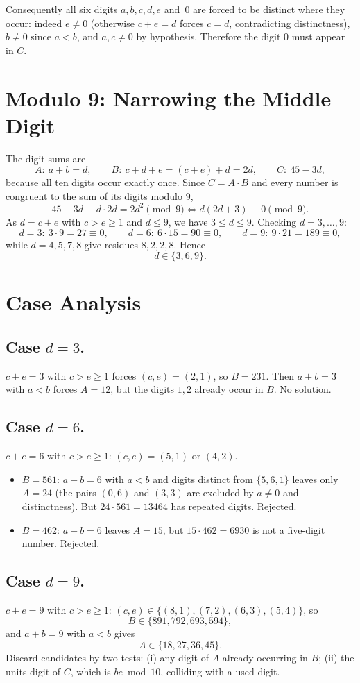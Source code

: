 \documentclass[10pt]{article}
\theoremstyle{definition}
\begin{document}
Consequently all six digits $a,b,c,d,e$ and~$0$ are forced to be distinct
where they occur: indeed $e\neq 0$ (otherwise $c+e=d$ forces $c=d$, contradicting
distinctness), $b\neq 0$ since $a<b$, and $a,c\neq 0$ by hypothesis. Therefore the
digit $0$ must appear in $C$.

\section*{Modulo 9: Narrowing the Middle Digit}
The digit sums are
\[
A:\ a+b=d,\qquad B:\ c+d+e=(c+e)+d=2d,\qquad C:\ 45-3d,
\]
because all ten digits occur exactly once. Since $C=A\cdot B$ and every number is
congruent to the sum of its digits modulo $9$,
\[
45-3d\equiv d\cdot 2d=2d^{2}\pmod 9
\iff d(2d+3)\equiv 0\pmod 9.
\]
As $d=c+e$ with $c>e\ge 1$ and $d\le 9$, we have $3\le d\le 9$. Checking
$d=3,\dots,9$:
\[
d=3:\ 3\cdot 9=27\equiv 0,\qquad
d=6:\ 6\cdot 15=90\equiv 0,\qquad
d=9:\ 9\cdot 21=189\equiv 0,
\]
while $d=4,5,7,8$ give residues $8,2,2,8$. Hence
\[
d\in\{3,6,9\}.
\]

\section*{Case Analysis}
\subsection*{Case $d=3$.}
$c+e=3$ with $c>e\ge 1$ forces $(c,e)=(2,1)$, so $B=231$. Then $a+b=3$ with
$a<b$ forces $A=12$, but the digits $1,2$ already occur in $B$. No solution.

\subsection*{Case $d=6$.}
$c+e=6$ with $c>e\ge 1$: $(c,e)=(5,1)$ or $(4,2)$.
\begin{itemize}
\item $B=561$: $a+b=6$ with $a<b$ and digits distinct from $\{5,6,1\}$ leaves only
$A=24$ (the pairs $(0,6)$ and $(3,3)$ are excluded by $a\neq 0$ and distinctness).
But $24\cdot 561=13464$ has repeated digits. Rejected.
\item $B=462$: $a+b=6$ leaves $A=15$, but $15\cdot 462=6930$ is not a five-digit
number. Rejected.
\end{itemize}

\subsection*{Case $d=9$.}
$c+e=9$ with $c>e\ge 1$: $(c,e)\in\{(8,1),(7,2),(6,3),(5,4)\}$, so
\[
B\in\{891,792,693,594\},
\]
and $a+b=9$ with $a<b$ gives
\[
A\in\{18,27,36,45\}.
\]
Discard candidates by two tests: (i) any digit of $A$ already occurring in $B$;
(ii) the units digit of $C$, which is $be \bmod 10$, colliding with a used digit.
\end{document}

